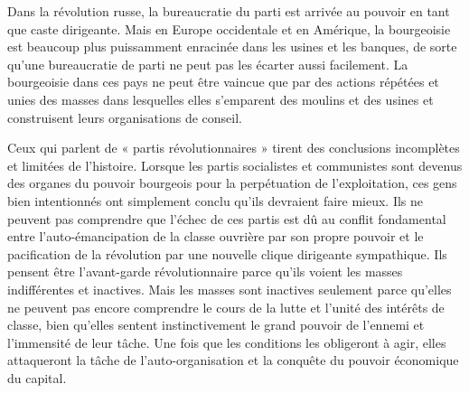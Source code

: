 Dans la révolution russe, la bureaucratie du parti est arrivée au pouvoir en tant que caste dirigeante. Mais en Europe occidentale et en Amérique, la bourgeoisie est beaucoup plus puissamment enracinée dans les usines et les banques, de sorte qu'une bureaucratie de parti ne peut pas les écarter aussi facilement. La bourgeoisie dans ces pays ne peut être vaincue que par des actions répétées et unies des masses dans lesquelles elles s'emparent des moulins et des usines et construisent leurs organisations de conseil.

Ceux qui parlent de « partis révolutionnaires » tirent des conclusions incomplètes et limitées de l'histoire. Lorsque les partis socialistes et communistes sont devenus des organes du pouvoir bourgeois pour la perpétuation de l'exploitation, ces gens bien intentionnés ont simplement conclu qu'ils devraient faire mieux. Ils ne peuvent pas comprendre que l'échec de ces partis est dû au conflit fondamental entre l'auto-émancipation de la classe ouvrière par son propre pouvoir et le pacification de la révolution par une nouvelle clique dirigeante sympathique. Ils pensent être l'avant-garde révolutionnaire parce qu'ils voient les masses indifférentes et inactives. Mais les masses sont inactives seulement parce qu'elles ne peuvent pas encore comprendre le cours de la lutte et l'unité des intérêts de classe, bien qu'elles sentent instinctivement le grand pouvoir de l'ennemi et l'immensité de leur tâche. Une fois que les conditions les obligeront à agir, elles attaqueront la tâche de l'auto-organisation et la conquête du pouvoir économique du capital.

